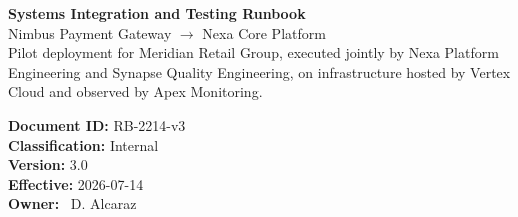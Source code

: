 \documentclass[11pt]{article}
\begin{document}

\begin{tcolorbox}[
  enhanced, breakable, colback=navyink, colframe=navyink,
  boxrule=0pt, arc=2pt, left=16pt, right=16pt, top=14pt, bottom=14pt,
  colupper=white,
]
\begin{minipage}[t]{0.68\textwidth}
  {\Large\bfseries\color{white} Systems Integration and Testing Runbook}\\[4pt]
  {\color{white!85!tealaccent}\large Nimbus Payment Gateway $\rightarrow$ Nexa Core Platform}\\[8pt]
  {\small\color{white!75!black} Pilot deployment for Meridian Retail Group, executed jointly by
  Nexa Platform Engineering and Synapse Quality Engineering, on infrastructure hosted by
  Vertex Cloud and observed by Apex Monitoring.}
\end{minipage}
\hfill
\begin{minipage}[t]{0.27\textwidth}
  \raggedleft
  \small\color{white}
  \textbf{Document ID:} RB-2214-v3\\
  \textbf{Classification:} Internal\\
  \textbf{Version:} 3.0\\
  \textbf{Effective:} 2026-07-14\\
  \textbf{Owner:} \faUser\ D. Alcaraz
\end{minipage}
\end{tcolorbox}

\vspace{0.2em}







\end{document}

